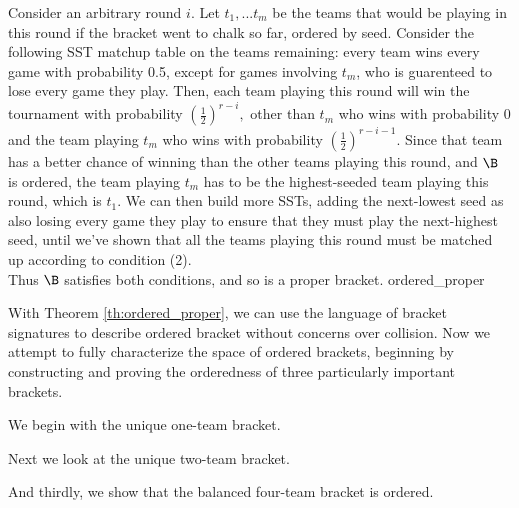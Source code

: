 {{    Consider an arbitrary round $i$. Let $t_1, ... t_m$ be the teams that would be playing in this round if the bracket went to chalk so far, ordered by seed. Consider the following SST matchup table on the teams remaining: every team wins every game with probability 0.5, except for games involving $t_m$, who is guarenteed to lose every game they play. Then, each team playing this round will win the tournament with probability $(\frac{1}{2})^{r-i},$ other than $t_m$ who wins with probability $0$ and the team playing $t_m$ who wins with probability $(\frac{1}{2})^{r-i-1}.$ Since that team has a better chance of winning than the other teams playing this round, and $\B$ is ordered, the team playing $t_m$ has to be the highest-seeded team playing this round, which is $t_1.$  We can then build more SSTs, adding the next-lowest seed as also losing every game they play to ensure that they must play the next-highest seed, until we've shown that all the teams playing this round must be matched up according to condition (2).\\

    Thus $\B$ satisfies both conditions, and so is a proper bracket.
}{ordered_proper}

With Theorem \ref{th:ordered_proper}, we can use the language of bracket signatures to describe ordered bracket without concerns over collision. Now we attempt to fully characterize the space of ordered brackets, beginning by constructing and proving the orderedness of three particularly important brackets.

We begin with the unique one-team bracket.


Next we look at the unique two-team bracket.


And thirdly, we show that the balanced four-team bracket is ordered.

}
